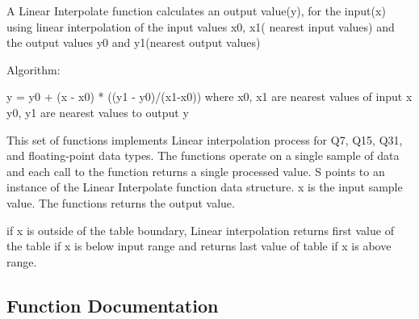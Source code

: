 \begin{DoxyParagraph}{}
 
\end{DoxyParagraph}
\begin{DoxyParagraph}{}
A Linear Interpolate function calculates an output value(y), for the input(x) using linear interpolation of the input values x0, x1( nearest input values) and the output values y0 and y1(nearest output values)
\end{DoxyParagraph}
\begin{DoxyParagraph}{Algorithm\+:}

\begin{DoxyPre}
      y = y0 + (x - x0) * ((y1 - y0)/(x1-x0))
      where x0, x1 are nearest values of input x
            y0, y1 are nearest values to output y
\end{DoxyPre}

\end{DoxyParagraph}
\begin{DoxyParagraph}{}
This set of functions implements Linear interpolation process for Q7, Q15, Q31, and floating-\/point data types. The functions operate on a single sample of data and each call to the function returns a single processed value. {\ttfamily S} points to an instance of the Linear Interpolate function data structure. {\ttfamily x} is the input sample value. The functions returns the output value.
\end{DoxyParagraph}
\begin{DoxyParagraph}{}
if x is outside of the table boundary, Linear interpolation returns first value of the table if x is below input range and returns last value of table if x is above range. 
\end{DoxyParagraph}


\subsection{Function Documentation}
\mbox{\label{group___linear_interpolate_ga790bbc697724ee432f840cfebbbae1f4}} 
